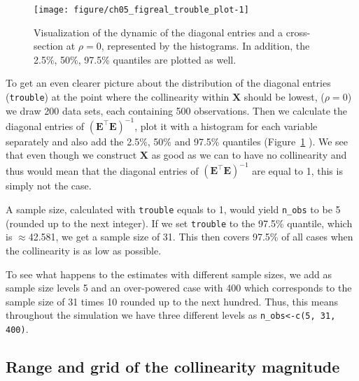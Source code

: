 \documentclass[11pt,a4paper,twoside]{book}\usepackage[]{graphicx}\usepackage[]{xcolor}
\newenvironment{knitrout}{}{} %
\begin{document}
\begin{figure}[h]%
\begin{center}
\begin{knitrout}
\color{fgcolor}
\texttt{[image: figure/ch05\_figreal\_trouble\_plot-1]} 
\end{knitrout}
\end{center}
\vspace{-1cm}
\caption{Visualization of the dynamic of the diagonal entries and a cross-section at $\rho=0$, represented by the histograms. In addition, the 2.5\%, 50\%, 97.5\% quantiles are plotted as well.}
\label{fig:real_trouble}
\end{figure}
\vspace{-0.4cm}
To get an even clearer picture about the distribution of the diagonal entries (\texttt{trouble}) at the point where the collinearity within $\boldsymbol{X}$ should be lowest, ($\rho=0$) we draw 200 data sets, each containing 500 observations. Then we calculate the diagonal entries of $\left(\boldsymbol{E^\top E}\right)^{-1}$, plot it with a histogram for each variable separately and also add the 2.5\%, 50\% and 97.5\% quantiles (Figure~\ref{fig:real_trouble}
). We see that even though we construct $\boldsymbol{X}$ as good as we can to have no collinearity and thus would mean that the diagonal entries of $\left(\boldsymbol{E^\top E}\right)^{-1}$ are equal to 1, this is simply not the case. 




A sample size, calculated with \texttt{trouble} equals to 1, would yield \texttt{n\_obs} to be 5 (rounded up to the next integer).
If we set \texttt{trouble} to the 97.5\% quantile, which is $\approx$42.581, we get a sample size of 31.
This then covers 97.5\% of all cases when the collinearity is as low as possible. 

To see what happens to the estimates with different sample sizes, we add as sample size levels 5 and an over-powered case with 400 which corresponds to the sample size of 31 times 10 rounded up to the next hundred.
Thus, this means throughout the simulation we have three different levels as \texttt{n\_obs<-c(5, 31, 400)}.

\subsection{Range and grid of the collinearity magnitude}
\end{document}
